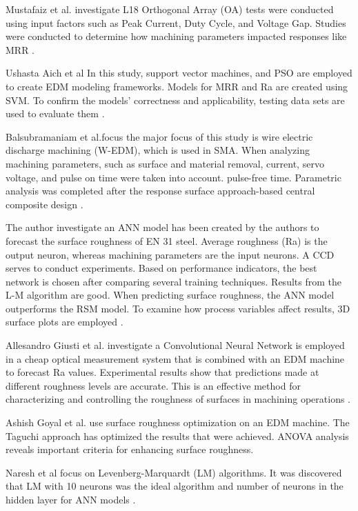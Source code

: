 \documentclass[suppldata]{interact}
\begin{document}
 Mustafaiz et al. investigate L18 Orthogonal Array (OA) tests were conducted using input factors such as Peak Current, Duty Cycle, and Voltage Gap. Studies were conducted to determine how machining parameters impacted responses like MRR \textbf{\cite{ahmad2016optimization}}.

 Ushasta Aich et al In this study, support vector machines, and PSO are employed to create EDM modeling frameworks. Models for MRR and Ra are created using SVM. To confirm the models' correctness and applicability, testing data sets are used to evaluate them \textbf{\cite{aich2014modeling}}.

 Balsubramaniam et al.focus the major focus of this study is wire electric discharge machining (W-EDM), which is used in SMA. When analyzing machining parameters, such as surface and material removal, current, servo voltage, and pulse on time were taken into account. pulse-free time. Parametric analysis was completed after the response surface approach-based central composite design \textbf{\cite{balasubramaniyan2021wire}}. 

The author investigate an ANN model has been created by the authors to forecast the surface roughness of EN 31 steel. Average roughness (Ra) is the output neuron, whereas machining parameters are the input neurons. A CCD serves to conduct experiments. Based on performance indicators, the best network is chosen after comparing several training techniques. Results from the L-M algorithm are good. When predicting surface roughness, the ANN model outperforms the RSM model. To examine how process variables affect results, 3D surface plots are employed \textbf{\cite{das2014prediction}}. 

 Allesandro Giusti et al. investigate a Convolutional Neural Network is employed in a cheap optical measurement system that is combined with an EDM machine to forecast Ra values. Experimental results show that predictions made at different roughness levels are accurate. This is an effective method for characterizing and controlling the roughness of surfaces in machining operations \textbf{\cite{giusti2020image}}.

Ashish Goyal et al. use surface roughness optimization on an EDM machine. The Taguchi approach has optimized the results that were achieved. ANOVA analysis reveals important criteria for enhancing surface roughness\textbf{\cite{goyal2021optimization}}.

 Naresh et al focus on Levenberg-Marquardt (LM) algorithms. It was discovered that LM with 10 neurons was the ideal algorithm and number of neurons in the hidden layer for ANN models \textbf{\cite{naresh2020artificial}}.
\end{document}
